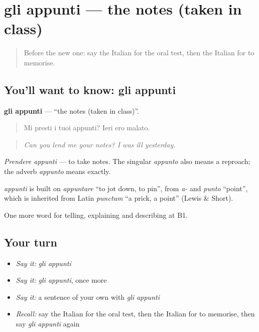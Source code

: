 \section[gli appunti]{gli appunti — the notes (taken in class)}

\label{lesson:IT-C382-appunti}



\begin{quote}
Before the new one: say the Italian for the oral test, then the Italian for to memorise.
\end{quote}

\subsection*{You'll want to know: gli appunti}
\textbf{gli appunti} — \textquotedblleft{}the notes (taken in class)\textquotedblright{}.

\begin{quote}
Mi presti i tuoi appunti? Ieri ero malato.
\end{quote}

\begin{quote}
\emph{Can you lend me your notes? I was ill yesterday.}
\end{quote}

\emph{Prendere appunti} — to take notes. The singular \emph{appunto} also means a reproach; the adverb \emph{appunto} means exactly.

\begin{cousinweb}
\emph{appunti} is built on \emph{appuntare} \textquotedblleft{}to jot down, to pin\textquotedblright{}, from \emph{a-} and \emph{punto} \textquotedblleft{}point\textquotedblright{}, which is inherited from Latin \emph{punctum} \textquotedblleft{}a prick, a point\textquotedblright{} (Lewis \& Short).
\end{cousinweb}

\begin{grammarlens}[title={What you've built}]
One more word for telling, explaining and describing at B1.
\end{grammarlens}

\subsection*{Your turn}
\begin{itemize}
\raggedright
  \item \emph{Say it:} \emph{gli appunti}
  \item \emph{Say it:} \emph{gli appunti}, once more
  \item \emph{Say it:} a sentence of your own with \emph{gli appunti}
  \item \emph{Recall:} say the Italian for the oral test, then the Italian for to memorise, then say \emph{gli appunti} again
\end{itemize}

